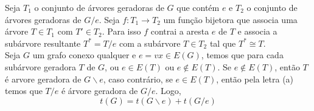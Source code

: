 
 Seja $T_1$ o conjunto de árvores geradoras de $G$ que contém $e$ e
$T_2$ o conjunto de árvores geradoras de $G/e$. Seja $f: T_1 \to T_2$ um função
bijetora  que associa uma árvore $T \in T_1$ com $T' \in T_2$. Para isso $f$
contrai a aresta $e$ de $T$ e associa a subárvore resultante $T^* = T/e$ com a
subárvore $T \in T_2$ tal que $T^* \cong T$.\\


 Seja $G$ um grafo conexo qualquer e $e = vx \in E(G)$, temos que para cada subárvore geradora $T$ de $G$, ou $e \in E(T)$ ou $e \notin E(T)$.
%
Se $e \notin E(T)$, então $T$ é arvore geradora de $G\backslash e$, caso contrário, se $e \in E(T)$, então pela letra (a) temos que $T/e$ é árvore geradora de $G/e$.
%
Logo, $$t(G) = t(G\backslash e) + t(G/e)$$
